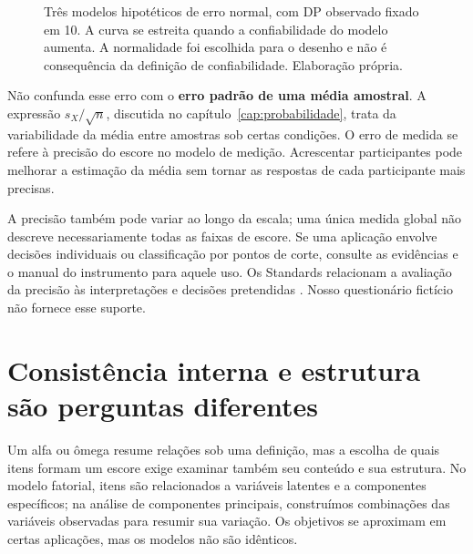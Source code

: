 \begin{figure}[H]
\centering
{}
\caption{Três modelos hipotéticos de erro normal, com DP observado fixado em 10. A curva se estreita quando a confiabilidade do modelo aumenta. A normalidade foi escolhida para o desenho e não é consequência da definição de confiabilidade. Elaboração própria.}
\label{fig:precisao-escore}
\end{figure}

Não confunda esse erro com o \textbf{erro padrão de uma média amostral}. A expressão $s_X/\sqrt n$, discutida no capítulo~\ref{cap:probabilidade}, trata da variabilidade da média entre amostras sob certas condições. O erro de medida se refere à precisão do escore no modelo de medição. Acrescentar participantes pode melhorar a estimação da média sem tornar as respostas de cada participante mais precisas.

A precisão também pode variar ao longo da escala; uma única medida global não descreve necessariamente todas as faixas de escore. Se uma aplicação envolve decisões individuais ou classificação por pontos de corte, consulte as evidências e o manual do instrumento para aquele uso. Os Standards relacionam a avaliação da precisão às interpretações e decisões pretendidas \parencite{Standards2014}. Nosso questionário fictício não fornece esse suporte.

\section{Consistência interna e estrutura são perguntas diferentes}

Um alfa ou ômega resume relações sob uma definição, mas a escolha de quais itens formam um escore exige examinar também seu conteúdo e sua estrutura. No modelo fatorial, itens são relacionados a variáveis latentes e a componentes específicos; na análise de componentes principais, construímos combinações das variáveis observadas para resumir sua variação. Os objetivos se aproximam em certas aplicações, mas os modelos não são idênticos.


